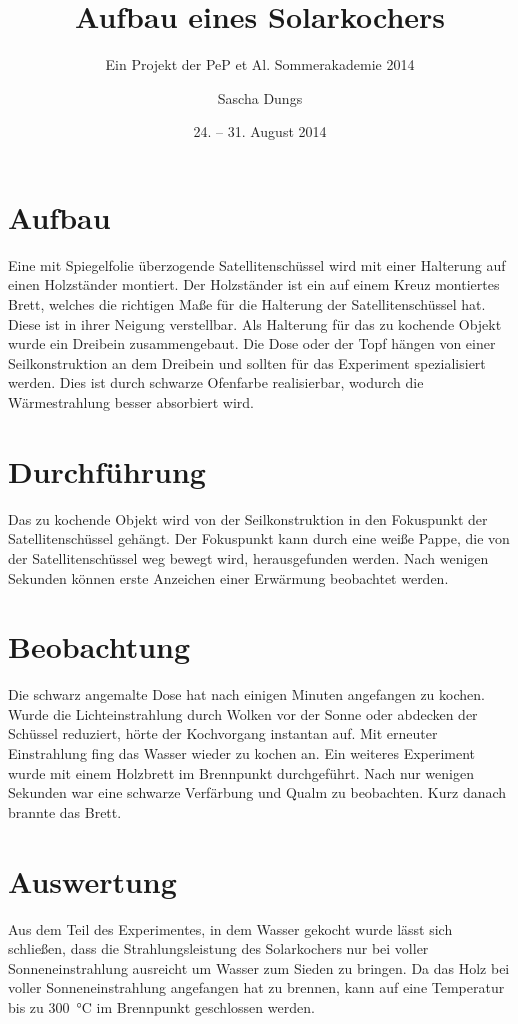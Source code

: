 

\title{Aufbau eines Solarkochers}
\subtitle{Ein Projekt der PeP et Al. Sommerakademie 2014}
\date{24. -- 31. August 2014}

\author{Sascha Dungs}


\maketitle
\tableofcontents


\section{Aufbau}

Eine mit Spiegelfolie überzogende Satellitenschüssel wird mit einer Halterung auf einen Holzständer montiert.
Der Holzständer ist ein auf einem Kreuz montiertes Brett, welches die richtigen Maße für die Halterung der Satellitenschüssel hat.
Diese ist in ihrer Neigung verstellbar.
Als Halterung für das zu kochende Objekt wurde ein Dreibein zusammengebaut.
Die Dose oder der Topf hängen von einer Seilkonstruktion an dem Dreibein und sollten für das Experiment spezialisiert werden.
Dies ist durch schwarze Ofenfarbe realisierbar, wodurch die Wärmestrahlung besser absorbiert wird. 


\section{Durchführung}

Das zu kochende Objekt wird von der Seilkonstruktion in den Fokuspunkt der Satellitenschüssel gehängt. Der Fokuspunkt kann durch eine weiße Pappe, die von der Satellitenschüssel weg bewegt wird, herausgefunden werden. Nach wenigen Sekunden können erste Anzeichen einer Erwärmung beobachtet werden.


\section{Beobachtung}

Die schwarz angemalte Dose hat nach einigen Minuten angefangen zu kochen. Wurde die Lichteinstrahlung durch Wolken vor der Sonne oder abdecken der Schüssel reduziert, hörte der Kochvorgang instantan auf. Mit erneuter Einstrahlung fing das Wasser wieder zu kochen an. 
Ein weiteres Experiment wurde mit einem Holzbrett im Brennpunkt durchgeführt. Nach nur wenigen Sekunden war eine schwarze Verfärbung und Qualm zu beobachten. Kurz danach brannte das Brett.



\section{Auswertung}

Aus dem Teil des Experimentes, in dem Wasser gekocht wurde lässt sich schließen, dass die Strahlungsleistung des Solarkochers nur bei voller Sonneneinstrahlung ausreicht um Wasser zum Sieden zu bringen.
Da das Holz bei voller Sonneneinstrahlung angefangen hat zu brennen, kann auf eine Temperatur bis zu \SI{300}{\celsius} im Brennpunkt geschlossen werden.

